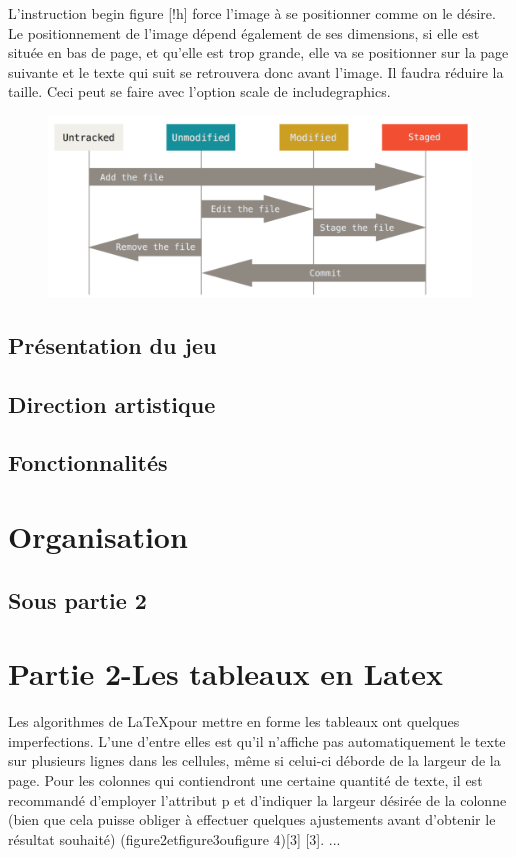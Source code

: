 \documentclass[12pt,a4paper, twoside]{article}
\begin{document}
    L’instruction \/begin figure [!h] force l’image à se positionner comme on le désire. Le positionnement de l’image dépend également de ses dimensions, si elle est située en bas de page, et qu’elle est trop grande, elle va se positionner sur la page suivante et le texte qui suit se retrouvera donc avant l’image. Il faudra réduire la taille. Ceci peut se faire avec l’option scale de includegraphics.


\begin{figure}[h]
    \centering
    \includegraphics[width=1\textwidth]{image.png}
    \label{fig:logo}
\end{figure}
\subsection{Présentation du jeu}
\subsection{Direction artistique}
\subsection{Fonctionnalités}
\section{Organisation}
\subsection{}
\subsection{Sous partie 2}
\section{Partie 2-Les tableaux en Latex}

    Les algorithmes de \LaTeX pour mettre en forme les tableaux ont quelques imperfections. L’une d’entre elles est qu’il n’affiche pas automatiquement le texte sur plusieurs lignes dans les cellules, même si celui-ci déborde de la largeur de la page. Pour les colonnes qui contiendront une certaine quantité de texte, il est recommandé d’employer l’attribut p et d’indiquer la largeur désirée de la colonne (bien que cela puisse obliger à effectuer quelques ajustements avant d’obtenir le résultat souhaité) (figure2etfigure3oufigure 4)[3] [3]. ...
\end{document}
